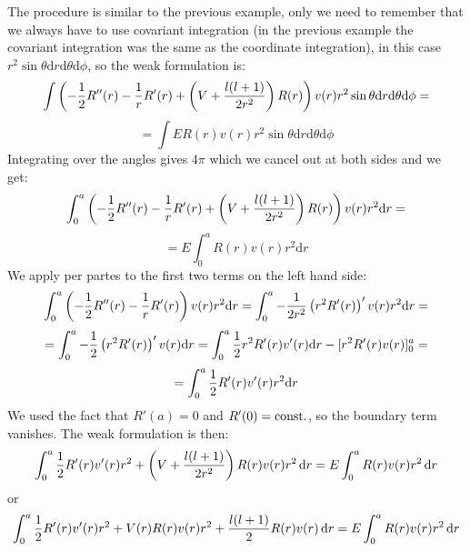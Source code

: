 \documentclass[12pt]{article}
\def\d{\mbox{d}}
\begin{document}
The procedure is similar to the previous example, only we need to remember that
we always have to use covariant integration (in the previous example the
covariant integration was the same as the coordinate integration),
in this case $r^2\sin\theta \d
r\d\theta\d\phi$, so the weak formulation is:
$$\int \left(-{1\over2}R''(r)-{1\over
r}R'(r)+\left(V+{l(l+1)\over2r^2}\right)R(r)\right)v(r)r^2\sin\theta \d
r\d\theta\d\phi=$$
$$
=\int ER(r) v(r)r^2\sin\theta \d r\d\theta\d\phi$$
Integrating over the angles gives $4\pi$ which we cancel out at both sides and
we get:
$$\int_0^a \left(-{1\over2}R''(r)-{1\over
r}R'(r)+\left(V+{l(l+1)\over2r^2}\right)R(r)\right)v(r)r^2 \d r=$$
$$
=E\int_0^a R(r) v(r)r^2 \d r$$
We apply per partes to the first two terms on the left hand side:
$$\int_0^a \left(-{1\over2}R''(r)-{1\over r}R'(r)\right)v(r)r^2 \d r
=\int_0^a -{1\over2r^2}\left(r^2 R'(r)\right)'v(r)r^2 \d r=
$$
$$
=\int_0^a -{1\over2}\left(r^2 R'(r)\right)'v(r) \d r
=\int_0^a {1\over2}r^2 R'(r)v'(r) \d r-[r^2R'(r)v(r)]_0^a=
$$
$$
=\int_0^a {1\over2} R'(r)v'(r) r^2\d r
$$
We used the fact that $R'(a)=0$ and $R'(0)=\rm const.$, so the boundary term vanishes. The weak formulation is then:
$$\int_0^a {1\over2}R'(r)v'(r)r^2+
\left(V+{l(l+1)\over2r^2}\right)R(r)v(r)r^2\,\d r
=
E\int_0^aR(r)v(r)r^2\,\d r
$$
or
$$\int_0^a {1\over2}R'(r)v'(r)r^2+
V(r)R(r)v(r)r^2+{l(l+1)\over2} R(r)v(r)\,\d r
=
E\int_0^aR(r)v(r)r^2\,\d r
$$
\end{document}
